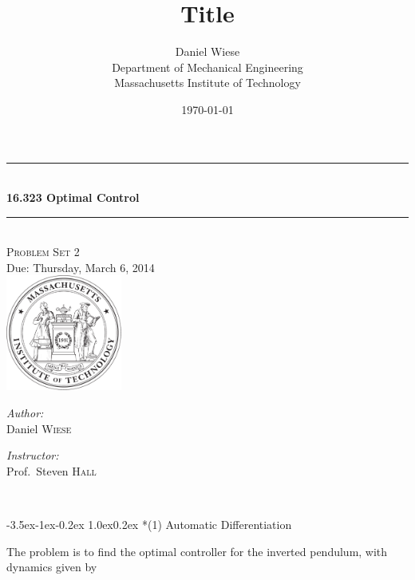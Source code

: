 \documentclass[11pt,letterpaper,onecolumn,notitlepage]{article}
\title{\textbf{Title}}
\author{Daniel Wiese \\ Department of Mechanical Engineering \\ Massachusetts Institute of Technology}
\date{\today}
\makeatletter
\renewcommand\section{\@startsection{section}{1}{\z@}%
{-3.5ex\@plus-1ex\@minus-0.2ex}%
{1.0ex\@plus0.2ex}%
{\fontsize{12pt}{12pt}\selectfont\bfseries\sffamily}}
\makeatother
\begin{document}
  \begin{titlepage}
    \begin{center}
      \rule{\linewidth}{0.01in} \\[0.25in]
      {\huge\bfseries 16.323 Optimal Control}\\[0.4cm]
      \rule{\linewidth}{0.01in} \\[0.25in]

      \textsc{\LARGE Problem Set 2}\\[0.15in]
      \large Due: Thursday, March 6, 2014 \\[1.0in]
      \includegraphics[width=1.5in]{../fig/mit-seal.pdf}\\[3.0in]

      \begin{minipage}{0.4\textwidth}
        \begin{flushleft} \large
          \emph{Author:}\\
          Daniel \textsc{Wiese}
          \vfill
        \end{flushleft}
      \end{minipage}
      \begin{minipage}{0.4\textwidth}
        \begin{flushright} \large
          \emph{Instructor:} \\
          Prof.~Steven \textsc{Hall} \\
        \end{flushright}
      \end{minipage} \\
      \vfill
    \end{center}
  \end{titlepage}

  \clearpage
  \section*{(1) Automatic Differentiation}

  The problem is to find the optimal controller for the inverted pendulum, with dynamics given by
\end{document}
